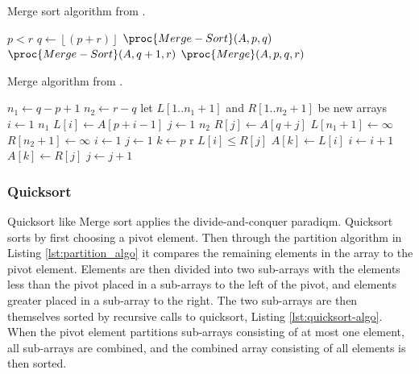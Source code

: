\documentclass[sigconf, nonacm, natbib, screen, balance=False]{acmart}
\begin{document}
\begin{listing}
  \caption{Merge sort algorithm from \citet[Ch.~2.3. p 31 ]{CLRS_2009}.}
  \label{lst:merge_algo}
\begin{codebox}
\li \If $p < r$
\li \Then
$q \gets \left \lfloor{(p+r)}\right \rfloor $
\li $\proc{Merge-Sort}(A, p, q)$
\li $\proc{Merge-Sort}(A, q+1, r)$
\li $\proc{Merge}(A, p, q, r)$
\End
\end{codebox}
\end{listing}

\begin{listing}
  \caption{Merge algorithm from \citet[Ch.~2.3. p 34 ]{CLRS_2009}.}
  \label{lst:merge_algo}

\begin{codebox}
    \li $n_1 \gets q - p + 1$
    \li $n_2 \gets r - q$
    \li let $L[1..n_1 + 1]$ and $R[1..n_2 +1]$ be new arrays
    \li \For $i \gets 1$ \To $n_1$
    \li \Do
    $L[i] \gets A[p + i - 1]$
    \End
    \li \For $j \gets 1$ \To $n_2$
    \li \Do
    $R[j] \gets A[q + j]$
    \End
    \li $L[n_1 + 1] \gets \infty$
    \li $R[n_2 + 1] \gets \infty$
    \li $i \gets 1$
    \li $j \gets 1$
    \li \For $k \gets p$ \To r
    \li \Do
    \If $L[i] \leq R[j]$
    \li \Do
    $A[k] \gets L[i]$
    \li $i \gets i + 1$
    \End
    \li \Do
    \Else $A[k] \gets R[j]$
    \li \Do
    $j \gets j + 1$
    \End
\end{codebox}

\end{listing}
\cite{CLRS_2009}

\FloatBarrier

\subsubsection{Quicksort}\label{sec:quicksort}

Quicksort like Merge sort applies the divide-and-conquer paradiqm. Quicksort sorts by first choosing a pivot element. Then through the partition algorithm in Listing \ref{lst:partition_algo} it compares the remaining elements in the array to the pivot element. Elements are then divided into two sub-arrays with the elements less than the pivot placed in a sub-arrays to the left of the pivot, and elements greater placed in a sub-array to the right. The two sub-arrays are then themselves sorted by recursive calls to quicksort, Listing \ref{lst:quicksort-algo}. When the pivot element partitions sub-arrays consisting of at most one element, all sub-arrays are combined, and the combined array consisting of all elements is then sorted. \cite[p. 170-172]{CLRS_2009}
\end{document}
